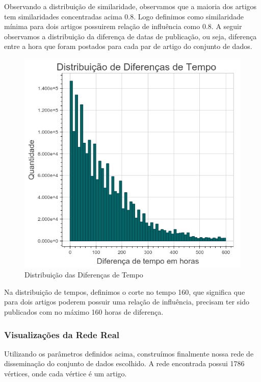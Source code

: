 \documentclass[a4paper,12pt]{article}
\begin{document}
Observando a distribuição de similaridade, observamos que a maioria dos artigos tem similaridades concentradas acima 0.8. Logo
definimos como similaridade mínima para dois artigos possuirem relação de influência como 0.8. A seguir observamos a distribuição da diferença
de datas de publicação, ou seja, diferença entre a hora que foram postados para cada par de artigo do conjunto de dados.

\pagebreak
\begin{figure}[ht]
 \centering
 \includegraphics[scale=0.6]{./tempos.png}
 \caption{Distribuição das Diferenças de Tempo}
\end{figure}

Na distribuição de tempos, definimos o corte no tempo 160, que significa que para dois artigos poderem possuir uma relação de 
influência, precisam ter sido publicados com no máximo 160 horas de diferença.



\pagebreak
\subsubsection{Visualizações da Rede Real}

Utilizando os parâmetros definidos acima, construímos finalmente nossa rede de disseminação do conjunto de dados escolhido.
A rede encontrada possui 1786 vértices, onde cada vértice é um artigo.
\end{document}
